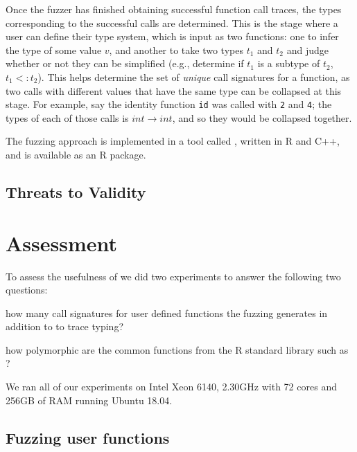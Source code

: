 \documentclass[sigplan,anonymous,review]{acmart}
\begin{document}
Once the fuzzer has finished obtaining successful function call traces, the types corresponding to the successful calls are determined.
This is the stage where a user can define their type system, which is input as two functions: one to infer the type of some value $v$, and another to take two types $t_1$ and $t_2$ and judge whether or not they can be simplified (e.g., determine if $t_1$ is a subtype of $t_2$, $t_1 <: t_2$).
This helps determine the set of \textit{unique} call signatures for a function, as two calls with different values that have the same type can be collapsed at this stage.
For example, say the identity function {\tt id} was called with {\tt 2} and {\tt 4}; the types of each of those calls is $int \rightarrow int$, and so they would be collapsed together. 

The fuzzing approach is implemented in a tool called \tool, written in R and C++, and is available as an R package.

\subsection{Threats to Validity}



\section{Assessment}
\label{sec:assessment}

To assess the usefulness of \tool we did two experiments to answer the following two questions:
\begin{inparaenum}[(1)]
    \item how many call signatures for user defined functions the fuzzing generates in addition to to trace typing?
    \item how polymorphic are the common functions from the R standard library such as \code{+,-,*,/}?
\end{inparaenum}
We ran all of our experiments on Intel Xeon 6140, 2.30GHz with 72 cores and 256GB of RAM running Ubuntu 18.04.

\subsection{Fuzzing user functions}
\end{document}
